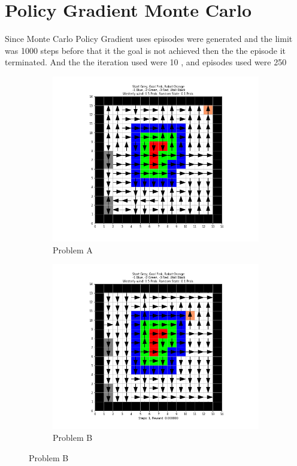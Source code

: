 \documentclass[12pt, letterpaper, twoside]{report}
\begin{document}
\section*{Policy Gradient Monte Carlo}
Since  Monte Carlo Policy Gradient uses episodes were generated and the limit was 1000 steps before that it the goal is not achieved then the the episode it terminated. And the  the iteration used were 10 , and episodes used were 250

\newpage
\begin{figure}[h!]
  \centering
  \begin{subfigure}[b]{0.5\linewidth}
    \includegraphics[width=0.8\linewidth]{Policy_Gradient__Problem_A_2.png}
    \caption{Problem A}
  \end{subfigure}
  \begin{subfigure}[b]{0.5\linewidth}
    \includegraphics[width=0.8\linewidth]{Policy_Gradient__Problem_B.png}
    \caption{Problem B}
  \end{subfigure}

\end{figure}
\end{document}
